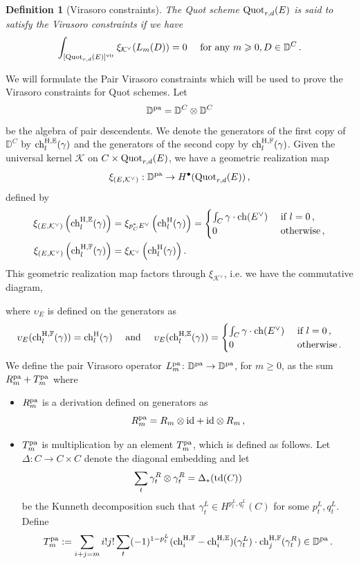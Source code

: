 \documentclass[11pt]{amsart}
\newtheorem{definition}[theorem]{Definition}
\theoremstyle{remark}
\newcommand{\ch}{{\rm ch}}
\newcommand{\F}{\mathbb{F}}
\newcommand{\D}{\mathbb{D}}
\newcommand{\E}{\mathbb{E}}
\newcommand{\K}{\mathcal{K}}
\newcommand{\id}{\textup{id}}
\newcommand{\quot}[0]{\textnormal{Quot}}
\newcommand{\vir}[0]{\textnormal{vir}}
\newcommand{\td}[0]{\textnormal{td}}
\newcommand{\pa}[0]{\textnormal{pa}}
\newcommand{\chh}[0]{\textnormal{ch}^\textnormal{H}}
\newcommand{\chhE}[0]{\textnormal{ch}^{\textnormal{H},\E}}
\newcommand{\chhF}[0]{\textnormal{ch}^{\textnormal{H},\F}}
\newcommand{\kv}{{\mathcal K^\vee}}
\numberwithin{theorem}{section}
\begin{document}
    \begin{definition}[Virasoro constraints]\label{Conjecture Virasoro quot}
        The Quot scheme $\quot_{r,d}(E)$ is said to satisfy
        the Virasoro constraints if we have
        $$\int_{[\quot_{r,d}(E)]^\vir} \xi_{\kv} (L_m(D)) = 0 \quad \text{ for any } m\geqslant 0, D \in \D^C\,.$$
    \end{definition}
We will formulate the Pair Virasoro constraints which will be used to prove the Virasoro constraints for Quot schemes.
Let \[\D^\pa=\D^C\otimes\D^C\]
be the algebra of pair descendents. We denote the generators of the first copy of $\D^C$ by  $\chhE_l(\gamma)$ and 
the generators of the second copy by  $\chhF_l(\gamma)$. 
Given the universal kernel $\K$ on $C\times \quot_{r,d}(E)$, we have a geometric realization map
\[\xi_{(E,\kv)}: \D^\pa\to H^\bullet(\quot_{r,d}(E))\,,\]
defined by
\begin{align*}
\xi_{(E,\kv)}\left(\chhE_l(\gamma)\right)&=\xi_{p_C^* E^\vee}\left(\chh_l(\gamma)\right)=\begin{cases}\int_C \gamma\cdot \ch(E^\vee)&\textup{ if }l=0\,,\\
0 & \textup{ otherwise}\,,\end{cases}\\
\xi_{(E,\kv)}\left(\chhF_l(\gamma)\right)&=\xi_{\kv}\left(\chh_l(\gamma)\right).
\end{align*}
This geometric realization map factors through $\xi_\kv$, i.e.
we have the commutative diagram,
\begin{center}
\end{center}
where $\upsilon_E$ is defined on the generators as
$$\upsilon_E(\chhF_l(\gamma)) = \chh_l(\gamma) \quad \textup{ and }
\quad 
\upsilon_E(\chhE_l(\gamma)) = \begin{cases}\int_C \gamma\cdot \ch(E^\vee)&\textup{ if }l=0\,,\\
0 & \textup{ otherwise}\,.\end{cases}$$
We define the pair Virasoro operator $L_m^{\pa}\colon \D^\pa\to \D^\pa$, for $m\geqslant 0$, as the sum $R_m^{\pa}+T_m^{\pa}$ where
\begin{itemize}
\item $R_m^{\pa}$ is a derivation defined on generators as
\[R_m^{\pa}=R_m\otimes \id+\id\otimes R_m\,,\]
\item $T_m^{\pa}$ is multiplication by an element $T_m^{\pa}$, which is defined as follows.
Let $\Delta: C \to C \times C$ denote the diagonal embedding
and let $$ \sum_t \gamma_t^R \otimes \gamma_t^R = \Delta_*(\td(C))$$
be the Kunneth decomposition such that $\gamma_t^L \in H^{p_t^L,q_t^L}(C)$ for some $p_t^L,q_t^L$. 
Define $$T_m^{\pa}:=\sum_{i+j=m} i!j!
\sum_t (-1)^{1- p_t^L}(\chhF_i - \chhE_i)(\gamma_t^L) \cdot \chhF_j(\gamma_t^R)\in \D^\pa \,.$$
\end{itemize}
\end{document}
